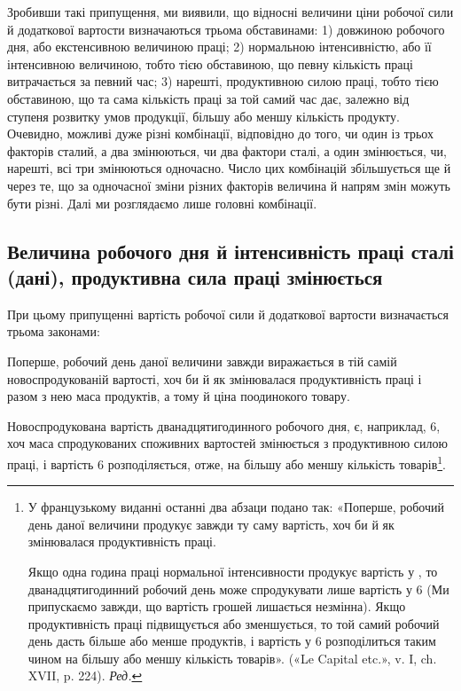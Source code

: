 Зробивши такі припущення, ми виявили, що відносні величини
ціни робочої сили й додаткової вартости визначаються
трьома обставинами: 1) довжиною робочого дня, або екстенсивною
величиною праці; 2) нормальною інтенсивністю, або її інтенсивною
величиною, тобто тією обставиною, що певну кількість
праці витрачається за певний час; 3) нарешті, продуктивною
силою праці, тобто тією обставиною, що та сама кількість праці
за той самий час дає, залежно від ступеня розвитку умов продукції,
більшу або меншу кількість продукту. Очевидно, можливі
дуже різні комбінації, відповідно до того, чи один із трьох факторів
сталий, а два змінюються, чи два фактори сталі, а один
змінюється, чи, нарешті, всі три змінюються одночасно. Число
цих комбінацій збільшується ще й через те, що за одночасної
зміни різних факторів величина й напрям змін можуть бути
різні. Далі ми розглядаємо лише головні комбінації.

\subsection{Величина робочого дня й інтенсивність праці сталі (дані),
продуктивна сила праці змінюється}

При цьому припущенні вартість робочої сили й додаткової
вартости визначається трьома законами:

Поперше, робочий день даної величини завжди виражається
в тій самій новоспродукованій вартості, хоч би й як змінювалася
продуктивність праці і разом з нею маса продуктів, а тому й
ціна поодинокого товару.

\disablefootnotebreak{}
Новоспродукована вартість дванадцятигодинного робочого
дня, є, наприклад, 6, хоч маса спродукованих споживних
вартостей змінюється з продуктивною силою праці, і вартість
6 розподіляється, отже, на більшу або меншу кількість
товарів\footnote*{
У французькому виданні останні два абзаци подано так: «Поперше,
робочий день даної величини продукує завжди ту саму вартість,
хоч би й як змінювалася продуктивність праці.

Якщо одна година праці нормальної інтенсивности продукує вартість
у , то дванадцятигодинний робочий день може спродукувати
лише вартість у 6 (Ми припускаємо завжди, що вартість грошей
лишається незмінна). Якщо продуктивність праці підвищується або зменшується,
то той самий робочий день дасть більше або менше продуктів,
і вартість у 6 розподілиться таким чином на більшу або меншу
кількість товарів». («Le Capital etc.», v. I, ch. XVII, p. 224). \emph{Ред.}
}.
\enablefootnotebreak{}

